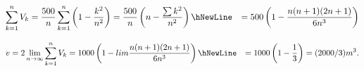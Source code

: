 \documentclass[11pt]{amsbook}
\begin{document}
\begin{exmp}
\begin{hSolution}
		\begin{equation}
			\begin{split}
			\sum_{k=1}^{n} V_{k}
			& = \frac{500}{n} \sum_{k=1}^{n} \left( 1 - \frac{ k^{2} }{ n^{2} } \right) 
			  = \frac{500}{n} \left( n - \frac{ \sum k^{2} }{ n^{2} } \right)
			  \hNewLine
			& = 500 \left( 1 - \frac{n(n + 1)(2n + 1)}{6n^{3}} \right)
			\end{split}
		\end{equation}

		\begin{equation}
			\begin{split}
			v
			& = 2 \lim_{n \to \infty} \sum_{k=1}^{n} V_{k} 
			= 1000 \left( 1 - lim \frac{ n(n + 1)(2n + 1) }{ 6n^{3} } \right)
			\hNewLine
			& = 1000 \left( 1 - \frac{1}{3} \right) = ( 2000/3 ) m^{3}.
			\end{split}
		\end{equation}
	\end{hSolution}
\end{exmp}
\end{document}

